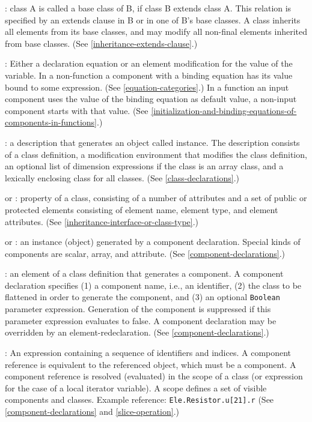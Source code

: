 : class A is called a base class of B, if class B
extends class A. This relation is specified by an extends clause in B or
in one of B's base classes. A class inherits all elements from its base
classes, and may modify all non-final elements inherited from base
classes. (See \cref{inheritance-extends-clause}.)

: Either a declaration equation or an element
modification for the value of the variable. In a non-function a component with a binding
equation has its value bound to some expression. (See \cref{equation-categories}.)
In a function an input component uses the value of the binding equation as default value,
a non-input component starts with that value.
(See \cref{initialization-and-binding-equations-of-components-in-functions}.)

: a description that generates an object called instance.
The description consists of a class definition, a modification
environment that modifies the class definition, an optional list of
dimension expressions if the class is an array class, and a lexically
enclosing class for all classes. (See \cref{class-declarations}.)

 or : property of a
class, consisting of a number of attributes and a set of public or
protected elements consisting of element name, element type, and element
attributes. (See \cref{inheritance-interface-or-class-type}.)

 or : an instance (object) generated
by a component declaration. Special kinds of components are scalar,
array, and attribute. (See \cref{component-declarations}.)

: an element of a class definition that generates a component.  A component declaration specifies (1) a component name, i.e., an identifier, (2) the class to be flattened in order to generate the component, and (3) an optional \lstinline!Boolean! parameter expression.  Generation of the component is suppressed if this parameter expression evaluates to false.  A component declaration may be overridden by an element-redeclaration.  (See \cref{component-declarations}.)

: An expression containing a sequence of
identifiers and indices. A component reference is equivalent to the
referenced object, which must be a component. A component reference is
resolved (evaluated) in the scope of a class (or expression for the case
of a local iterator variable). A scope defines a set of visible
  components and classes. Example reference: \lstinline!Ele.Resistor.u[21].r! (See
\cref{component-declarations} and \cref{slice-operation}.)

